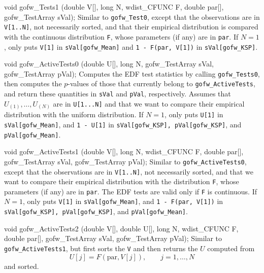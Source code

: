 void gofw_Tests1 (double V[], long N, wdist_CFUNC F, double par[],
                  gofw_TestArray sVal);
\endcode
\tab  Similar to {\tt gofw\_Test0}, except that
 the observations are in {\tt V[1..N]},
 not necessarily sorted, and that their empirical
 distribution is compared with the continuous distribution {\tt F},
 whose parameters (if any) are in {\tt par}.
 If $N = 1$, only puts {\tt V[1]} in {\tt sVal[gofw\_Mean]}
 and {\tt 1 - F(par, V[1])} in {\tt sVal[gofw\_KSP]}.
\endtab
\code


void gofw_ActiveTests0 (double U[], long N,
                        gofw_TestArray sVal, gofw_TestArray pVal);
\endcode
\tab  Computes the EDF test statistics by calling
  {\tt gofw\_Tests0}, then computes the $p$-values of those
  that currently belong to {\tt gofw\_ActiveTests},
  and return these quantities in {\tt sVal} and {\tt pVal}, respectively.
  Assumes that $U_{(1)},\dots,U_{(N)}$ are in {\tt U[1...N]}
  and that we want to compare their empirical distribution
  with the uniform distribution.
  If $N = 1$, only puts {\tt U[1]} in {\tt sVal[gofw\_Mean]},
  and {\tt 1 - U[1]} in {\tt sVal[gofw\_KSP], pVal[gofw\_KSP]}, and
  {\tt pVal[gofw\_Mean]}.
\endtab
\code


void gofw_ActiveTests1 (double V[], long N, wdist_CFUNC F, double par[],
                        gofw_TestArray sVal, gofw_TestArray pVal);
\endcode
\tab Similar to {\tt gofw\_ActiveTests0},
 except that the observations are in {\tt V[1..N]},
 not necessarily sorted, and that we want to compare their empirical
 distribution with the distribution {\tt F},
 whose parameters (if any) are in {\tt par}.
 The EDF tests are valid only if {\tt F} is continuous.
 If $N = 1$, only puts {\tt V[1]} in {\tt sVal[gofw\_Mean]},
 and {\tt 1 - F(par, V[1])} in {\tt sVal[gofw\_KSP], pVal[gofw\_KSP]},
 and {\tt pVal[gofw\_Mean]}.
 \endtab
\code


void gofw_ActiveTests2 (double V[], double U[], long N, wdist_CFUNC F,
                        double par[], gofw_TestArray sVal,
                        gofw_TestArray pVal);
\endcode
\tab Similar to {\tt gofw\_ActiveTests1}, but first sorts the {\tt V}
 and then  returns the $U$   computed from
$$
   U[j] = F(\mbox{par}, V[j]), \qquad j=1,\ldots,N
$$
  and sorted.
 \endtab
\code


